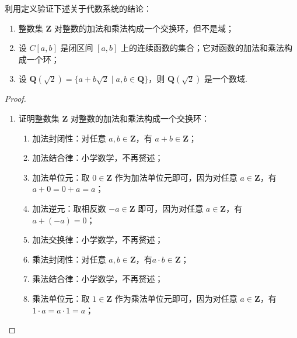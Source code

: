 \begin{example}{}{}
    利用定义验证下述关于代数系统的结论：
    \begin{enumerate}
        \item 整数集 $\mathbf{Z}$ 对整数的加法和乘法构成一个交换环，但不是域；

        \item 设 $C[a,b]$ 是闭区间 $[a,b]$ 上的连续函数的集合；它对函数的加法和乘法构成一个环；

        \item 设 $\mathbf{Q}(\sqrt{2})=\{a + b\sqrt{2} \mid a, b \in \mathbf{Q}\}$，则 $\mathbf{Q}(\sqrt{2})$ 是一个数域.
    \end{enumerate}
\end{example}

\begin{proof}
\begin{enumerate}
    \item 证明整数集 $\mathbf{Z}$ 对整数的加法和乘法构成一个交换环：
    \begin{enumerate}
        \item 加法封闭性：对任意 $a, b \in \mathbf{Z}$，有
        $a + b \in \mathbf{Z}$；

        \item 加法结合律：小学数学，不再赘述；

        \item 加法单位元：取 $0 \in \mathbf{Z}$ 作为加法单位元即可，因为对任意 $a \in \mathbf{Z}$，有$a + 0 = 0 + a = a$；

        \item 加法逆元：取相反数 $-a \in \mathbf{Z}$ 即可，因为对任意 $a \in \mathbf{Z}$，有 $a + (-a) = 0$；

        \item 加法交换律：小学数学，不再赘述；

        \item 乘法封闭性：对任意 $a, b \in \mathbf{Z}$，有$a \cdot b \in \mathbf{Z}$；

        \item 乘法结合律：小学数学，不再赘述；

        \item 乘法单位元：取 $1 \in \mathbf{Z}$ 作为乘法单位元即可，因为对任意 $a \in \mathbf{Z}$，有 $1 \cdot a = a \cdot 1 = a$；


\end{enumerate}
\end{enumerate}
\end{proof}
